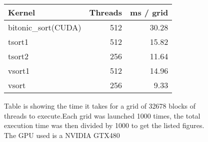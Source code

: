 

\begin{figure}
\begin{center}
  \begin{tabular}{  l | r | r}
    Kernel               & Threads   & ms / grid   \\ \hline
    bitonic\_sort(CUDA)  & 512       & 30.28       \\      
    tsort1               & 512       & 15.82       \\
    tsort2               & 256       & 11.64       \\ 
    vsort1               & 512       & 14.96       \\ 
    vsort                & 256       &  9.33       \\ 
  \end{tabular}
\end{center}
\label{fig:expressive-table}
\caption{Table is showing the time it takes for a grid of 32678 blocks of 
threads to execute.Each grid was launched 1000 times, the total execution time 
was then divided by 1000 to get the listed figures. The GPU used is a NVIDIA GTX480} 
\end{figure}
